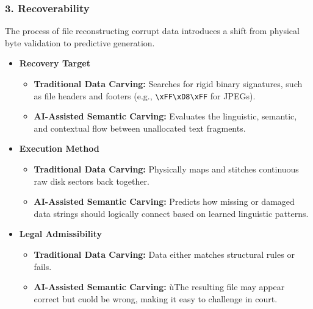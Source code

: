 \subsubsection*{3. Recoverability}
The process of file reconstructing corrupt data introduces a shift from physical byte validation to predictive generation.
\begin{itemize}
    \item \textbf{Recovery Target}
    \begin{itemize}
        \item \textbf{Traditional Data Carving:} Searches for rigid binary signatures, such as file headers and footers (e.g., \texttt{\textbackslash xFF\textbackslash xD8\textbackslash xFF} for JPEGs).
        \item \textbf{AI-Assisted Semantic Carving:} Evaluates the linguistic, semantic, and contextual flow between unallocated text fragments.
    \end{itemize}

    \item \textbf{Execution Method}
    \begin{itemize}
        \item \textbf{Traditional Data Carving:} Physically maps and stitches continuous raw disk sectors back together.
        \item \textbf{AI-Assisted Semantic Carving:} Predicts how missing or damaged data strings should logically connect based on learned linguistic patterns.
    \end{itemize}

    \item \textbf{Legal Admissibility}
    \begin{itemize}
        \item \textbf{Traditional Data Carving:} Data either matches structural rules or fails.
        \item \textbf{AI-Assisted Semantic Carving:} ùThe resulting file may appear correct but cuold be wrong, making it easy to challenge in court.
    \end{itemize}
\end{itemize}